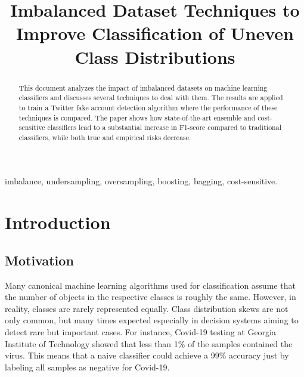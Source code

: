 \documentclass[conference]{IEEEtran}
\begin{document}
\title{Imbalanced Dataset Techniques to Improve Classification of Uneven Class Distributions\\
}

\author{
\and
{}
\and
{}
}

\maketitle

\begin{abstract}
This document analyzes the impact of imbalanced datasets on machine learning classifiers and discusses several techniques to deal with them. The results are applied to train a Twitter fake account detection algorithm where the performance of these techniques is compared. The paper shows how state-of-the-art ensemble and cost-sensitive classifiers lead to a substantial increase in F1-score compared to traditional classifiers, while both true and empirical risks decrease.
\end{abstract}

\begin{IEEEkeywords}
imbalance, undersampling, oversampling, boosting, bagging, cost-sensitive.
\end{IEEEkeywords}

\section{Introduction}
	\subsection{Motivation}
	Many canonical machine learning algorithms used for classification assume that the number of objects in the respective classes is roughly the same. However, in reality, classes are rarely represented equally. Class distribution skews are not only common, but many times expected \cite{data_imbalance_overview} especially in decision systems aiming to detect rare but important cases. For instance, Covid-19 testing at Georgia Institute of Technology showed that less than 1\% of the samples contained the virus. This means that a naive classifier could achieve a 99\% accuracy just by labeling all samples as negative for Covid-19.
	
\end{document}

